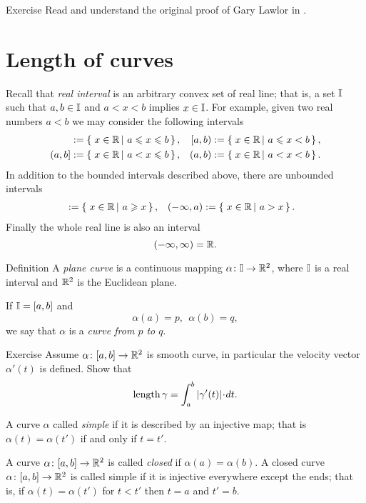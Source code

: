 \begin{thm}{Exercise} Read and understand the original proof of Gary Lawlor in \cite{lawlor}.
\end{thm}



\section{Length of curves}

Recall that \emph{real interval} is an arbitrary convex set of real line;
that is, a set $\mathbb{I}$ such that $a,b\in \mathbb{I}$ and $a<x<b$ implies $x\in\mathbb{I}$.
For example, given two real numbers $a<b$ we may consider the following intervals
\begin{align*}
[a,b]
&\df
\set{x\in \RR}{a\le x\le b},
&
[a,b)
&\df
\set{x\in \RR}{a\le x< b},
\\
(a,b]
&\df
\set{x\in \RR}{a< x\le b},
&
(a,b)
&\df
\set{x\in \RR}{a< x< b}.
\end{align*}
In addition to the bounded intervals described above, there are unbounded intervals
\begin{align*}
[a,\infty)
&\df
\set{x\in \RR}{a\le x},
&
(a,\infty)
&\df
\set{x\in \RR}{a< x},
\\
(-\infty,a]
&\df
\set{x\in \RR}{a\ge x},
&
(-\infty,a)
&\df
\set{x\in \RR}{a> x}.
\end{align*}
Finally the whole real line is also an interval
$$(-\infty,\infty)=\mathbb{R}.$$

\begin{thm}{Definition}\label{def:curve}
A \emph{plane curve} is a continuous mapping $\alpha\colon\mathbb{I}\to \mathbb{R}^2$,
where $\mathbb{I}$ is a real interval and $\mathbb{R}^2$ is the Euclidean plane. 

If $\mathbb{I}=[a,b]$ and 
$$\alpha(a)=p,\ \ \alpha(b)=q,$$
we say that $\alpha$ is a \emph{curve from $p$ to $q$}.
\end{thm}

\begin{thm}{Exercise}
Assume $\alpha\colon[a,b]\to\mathbb{R}^2$ is smooth curve, in particular the velocity vector $\alpha'(t)$ is defined.
Show that
\[\length \gamma=\int_a^b|\gamma'(t)|\cdot dt.\]
\end{thm}



A curve $\alpha$ called \emph{simple} if it is described by an injective map;
that is $\alpha(t)=\alpha(t')$ if and only if $t=t'$.

A curve $\alpha\colon[a,b]\to \mathbb{R}^2$ is called \emph{closed} if $\alpha(a)=\alpha(b)$.
A closed curve $\alpha\colon[a,b]\to \mathbb{R}^2$ is called simple if it is injective 
everywhere except the ends; that is, if
$\alpha(t)=\alpha(t')$ for $t<t'$ then $t=a$ and $t'=b$. 


